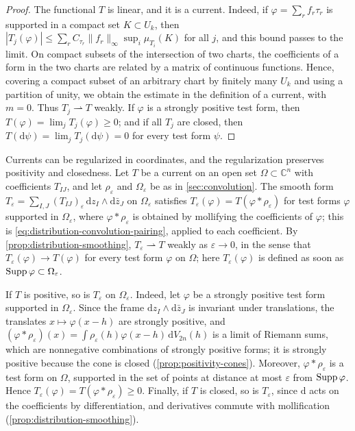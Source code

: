 \begin{proof}
The functional $T$ is linear, and it is a current. Indeed, if $\varphi=\sum_rf_r\tau_r$ is supported in a compact set $K\subset U_k$, then $|T_j(\varphi)|\leq\sum_rC_{\tau_r}\|f_r\|_\infty\sup_i\mu_{T_i}(K)$ for all $j$, and this bound passes to the limit. On compact subsets of the intersection of two charts, the coefficients of a form in the two charts are related by a matrix of continuous functions. Hence, covering a compact subset of an arbitrary chart by finitely many $U_k$ and using a partition of unity, we obtain the estimate in the definition of a current, with $m=0$. Thus $T_j\rightharpoonup T$ weakly. If $\varphi$ is a strongly positive test form, then $T(\varphi)=\lim_jT_j(\varphi)\geq0$; and if all $T_j$ are closed, then $T(\mathrm d\psi)=\lim_jT_j(\mathrm d\psi)=0$ for every test form $\psi$.
\end{proof}

Currents can be regularized in coordinates, and the regularization preserves positivity and closedness. Let $T$ be a current on an open set $\Omega\subset\mathbb C^n$ with coefficients $T_{IJ}$, and let $\rho_\varepsilon$ and $\Omega_\varepsilon$ be as in \cref{sec:convolution}. The smooth form $T_\varepsilon=\sum_{I,J}(T_{IJ})_\varepsilon\,\mathrm dz_I\wedge\mathrm d\bar z_J$ on $\Omega_\varepsilon$ satisfies $T_\varepsilon(\varphi)=T(\varphi*\rho_\varepsilon)$ for test forms $\varphi$ supported in $\Omega_\varepsilon$, where $\varphi*\rho_\varepsilon$ is obtained by mollifying the coefficients of $\varphi$; this is \eqref{eq:distribution-convolution-pairing}, applied to each coefficient. By \cref{prop:distribution-smoothing}, $T_\varepsilon\rightharpoonup T$ weakly as $\varepsilon\to0$, in the sense that $T_\varepsilon(\varphi)\to T(\varphi)$ for every test form $\varphi$ on $\Omega$; here $T_\varepsilon(\varphi)$ is defined as soon as $\operatorname{Supp}\varphi\subset\Omega_\varepsilon$.

If $T$ is positive, so is $T_\varepsilon$ on $\Omega_\varepsilon$. Indeed, let $\varphi$ be a strongly positive test form supported in $\Omega_\varepsilon$. Since the frame $\mathrm dz_I\wedge\mathrm d\bar z_J$ is invariant under translations, the translates $x\mapsto\varphi(x-h)$ are strongly positive, and $(\varphi*\rho_\varepsilon)(x)=\int\rho_\varepsilon(h)\varphi(x-h)\,\mathrm dV_{2n}(h)$ is a limit of Riemann sums, which are nonnegative combinations of strongly positive forms; it is strongly positive because the cone is closed (\cref{prop:positivity-cones}). Moreover, $\varphi*\rho_\varepsilon$ is a test form on $\Omega$, supported in the set of points at distance at most $\varepsilon$ from $\operatorname{Supp}\varphi$. Hence $T_\varepsilon(\varphi)=T(\varphi*\rho_\varepsilon)\geq0$. Finally, if $T$ is closed, so is $T_\varepsilon$, since $\mathrm d$ acts on the coefficients by differentiation, and derivatives commute with mollification (\cref{prop:distribution-smoothing}).

